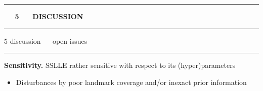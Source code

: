\documentclass[11pt, compress, t, notes = noshow, xcolor = table, 
aspectratio = 1610]{beamer}
\newcommand{\highlight}[1]{\textcolor{highlightcol}{\textbf{#1}}}
\newcommand{\arritem}{\item[\highlight{$\rightarrow$}]}
\newcommand{\flexitem}[1]{\item[$\highlight{#1}$]}
\begin{document}

% 
% 


\LARGE
\begin{frame}{\phantom{foo}}
\normalsize
\vspace{-0.5cm}
\noindent \textcolor{gray!90}{\rule{\textwidth}{1pt}}
\smallskip

\Huge
\hspace{0pt}
\vfill
\textbf{\highlight{~~ 5 ~~ DISCUSSION}}
\vfill
\hspace{0pt}

\noindent \textcolor{gray!90}{\rule{\textwidth}{1pt}}

\end{frame}


\LARGE
\begin{frame}{\textcolor{gray!90}{5 discussion} ~~ open issues}
\normalsize
\vspace{-0.5cm}
\noindent \textcolor{gray!90}{\rule{\textwidth}{1pt}}
\smallskip

\textbf{Sensitivity.} SSLLE rather sensitive with respect to its
(hyper)parameters

\begin{itemize}
  \arritem Disturbances by poor landmark coverage and/or inexact prior 
  information 
\end{itemize}

\vspace{0.3cm}

\end{frame}
\end{document}

